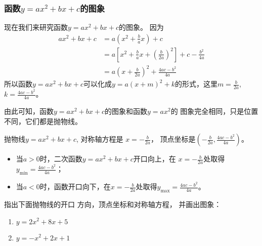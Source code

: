 \subsubsection{函数$y=ax^2+bx+c$的图象}
现在我们来研究函数$y=ax^2+bx+c$的图象。
因为
\[\begin{split}
ax^2+bx+c&=a\left(x^2+\frac{b}{a}x\right)+c\\
&=a\left[x^2+\frac{b}{a}x+\left(\frac{b}{2a}\right)^2\right]+c-\frac{b^2}{4a}\\
&=a\left(x+\frac{b}{2a}\right)^2+\frac{4ac-b^2}{4a}
\end{split}\]    
所以函数$y=ax^2+bx+c$可以化成$y=a(x+m)^2+k$的形式，这里$m=\frac{b}{2a}$, $k=\frac{4ac-b^2}{4a}$。

由此可知，函数$y=ax^2+bx+c$的图象和函数$y=ax^2$的
图象完全相同，只是位置不同，它们都是抛物线。

抛物线$y=ax^2+bx+c$, 对称轴方程是
$x=-\frac{b}{2a}$，
顶点坐标是$\left(-\frac{b}{2a},\frac{4ac-b^2}{4a}\right)$。
\begin{itemize}
    \item 当$a>0$时，二次函数$y=ax^2+bx+c$开口向上，在
$x=-\frac{b}{2a}$处取得$y_{\min}=\frac{4ac-b^2}{4a}$；
\item 当$a<0$时，函数开口向下，在$x=-\frac{b}{2a}$处取得$y_{\max}=\frac{4ac-b^2}{4a}$。
\end{itemize}

\begin{example}
    指出下面抛物线的开口
方向，顶点坐标和对称轴方程，
并画出图象：
\begin{multicols}{2}
\begin{enumerate}
    \item $y=2x^2+8x+5$
    \item $y=-x^2+2x+1$
\end{enumerate}
\end{multicols}
\end{example}

